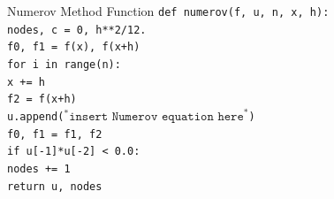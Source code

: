 \documentclass{beamer}
\begin{document}
\begin{frame}{Numerov Method Function} 
        {
        \texttt{def numerov(f, u, n, x, h):} \\
        \hspace{0.5cm} \texttt{nodes, c = 0, h**2/12.} \\
        \hspace{0.5cm} \texttt{f0, f1 = f(x), f(x+h)} \\
        \hspace{0.5cm} \texttt{for i in range(n):} \\
        \hspace{0.5cm} \hspace{0.5cm} \texttt{x += h} \\
        \hspace{0.5cm} \hspace{0.5cm} \texttt{f2 = f(x+h)} \\
        \hspace{0.5cm} \hspace{0.5cm} \texttt{u.append($^*\texttt{insert Numerov equation here}^*$)} \\
        \hspace{0.5cm} \hspace{0.5cm} \texttt{f0, f1 = f1, f2} \\
        \hspace{0.5cm} \hspace{0.5cm} \texttt{if u[-1]*u[-2] < 0.0:} \\
        \hspace{0.5cm} \hspace{0.5cm} \hspace{0.5cm} \texttt{nodes += 1} \\
        \hspace{0.5cm} \texttt{return u, nodes}
        }
\end{frame}
\end{document}
